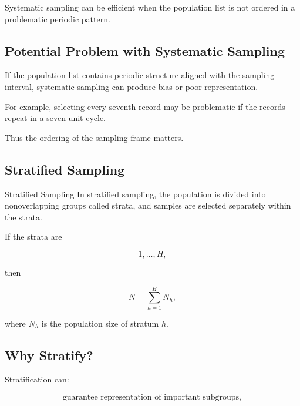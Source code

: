 Systematic sampling can be efficient when the population list is not
ordered in a problematic periodic pattern.

\subsection{Potential Problem with Systematic Sampling}
\label{subsec:systematic-sampling-periodicity}

If the population list contains periodic structure aligned with the
sampling interval, systematic sampling can produce bias or poor
representation.

For example, selecting every seventh record may be problematic if the
records repeat in a seven-unit cycle.

Thus the ordering of the sampling frame matters.

\subsection{Stratified Sampling}
\label{subsec:stratified-sampling}

\begin{definitionbox}{Stratified Sampling}
In stratified sampling, the population is divided into nonoverlapping
groups called strata, and samples are selected separately within the
strata.
\end{definitionbox}

If the strata are

\[
1,\ldots,H,
\]

then

\[
\boxed{
N
=
\sum_{h=1}^{H}N_h,
}
\]

where \(N_h\) is the population size of stratum \(h\).

\subsection{Why Stratify?}
\label{subsec:why-stratify}

Stratification can:

\[
\boxed{
\text{guarantee representation of important subgroups},
}
\]

